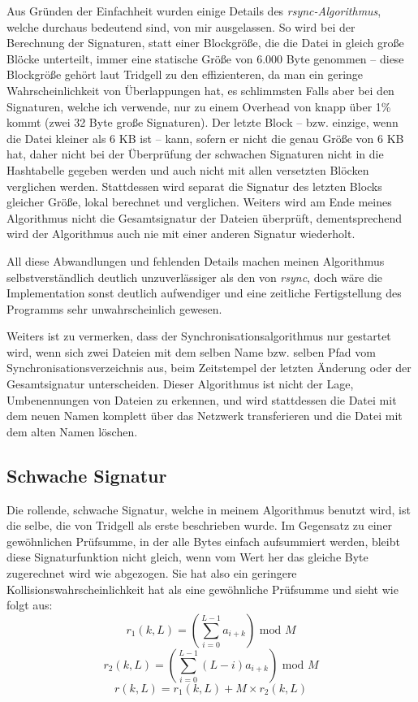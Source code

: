Aus Gründen der Einfachheit wurden einige Details des \textit{rsync-Algorithmus}, welche durchaus bedeutend sind, von mir ausgelassen.
So wird bei der Berechnung der Signaturen, statt einer Blockgröße, die die Datei in gleich große Blöcke unterteilt\cite{Tridgell99}, 
immer eine statische Größe von 6.000 Byte genommen -- diese Blockgröße gehört laut Tridgell zu den effizienteren, da man ein geringe Wahrscheinlichkeit
von Überlappungen hat, es schlimmsten Falls aber bei den Signaturen, welche ich verwende, nur zu einem Overhead von knapp über 1\% kommt (zwei
32 Byte große Signaturen). Der letzte Block -- bzw. einzige, wenn die Datei kleiner als 6 KB ist -- kann, sofern er nicht die genau Größe von 6 KB hat, 
daher nicht bei der Überprüfung der schwachen Signaturen nicht in die Hashtabelle gegeben werden und auch nicht mit allen versetzten Blöcken verglichen werden. 
Stattdessen wird separat die Signatur des letzten Blocks gleicher Größe, lokal berechnet und verglichen.
Weiters wird am Ende meines Algorithmus nicht die Gesamtsignatur der Dateien überprüft, dementsprechend wird der Algorithmus auch nie mit einer anderen 
Signatur wiederholt.

All diese Abwandlungen und fehlenden Details machen meinen Algorithmus selbstverständlich deutlich unzuverlässiger als den von \textit{rsync},
doch wäre die Implementation sonst deutlich aufwendiger und eine zeitliche Fertigstellung des Programms sehr unwahrscheinlich gewesen.

Weiters ist zu vermerken, dass der Synchronisationsalgorithmus nur gestartet wird, wenn sich zwei Dateien mit dem selben Name bzw. selben Pfad vom
Synchronisationsverzeichnis aus, beim Zeitstempel der letzten Änderung oder der Gesamtsignatur unterscheiden.
Dieser Algorithmus ist nicht der Lage, Umbenennungen von Dateien zu erkennen, und wird stattdessen die Datei mit dem neuen Namen komplett über 
das Netzwerk transferieren und die Datei mit dem alten Namen löschen.

\subsection{Schwache Signatur}

Die rollende, schwache Signatur, welche in meinem Algorithmus benutzt wird, ist die selbe, die von Tridgell als erste beschrieben wurde\cite{Tridgell99}.
Im Gegensatz zu einer gewöhnlichen Prüfsumme, in der alle Bytes einfach aufsummiert werden, bleibt diese Signaturfunktion nicht gleich, wenn
vom Wert her das gleiche Byte zugerechnet wird wie abgezogen. Sie hat also ein geringere Kollisionswahrscheinlichkeit hat als eine gewöhnliche
Prüfsumme und sieht wie folgt aus\cite{Tridgell99}:
\begin{equation}
    r_1(k,L) = (\sum_{i=0}^{L-1}a_{i+k}) \textrm{ mod } M 
\end{equation}
\begin{equation}
    r_2(k,L) = (\sum_{i=0}^{L-1}(L-i)a_{i+k}) \textrm{ mod } M 
\end{equation}
\begin{equation}
    r(k,L) = r_1(k,L) + M \times r_2(k,L)
\end{equation}

